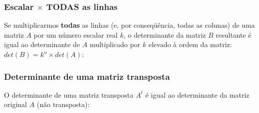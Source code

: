 \documentclass[pdftex, brazil]{beamer}
\begin{document}
\begin{frame}[t]
  \frametitle{Escalar $\times$ TODAS as linhas}
  Se multiplicarmos \textbf{todas} as linhas (e, por conseqüência, todas as
  colunas) de uma matriz $A$ por um número escalar real $k$, o determinante da
  matriz $B$ resultante é igual ao determinante de $A$ multiplicado por $k$ elevado
  à ordem da matriz: $det(B) = k^n \times det(A)$:

\end{frame}

\begin{frame}[t]
  \frametitle{Determinante de uma matriz transposta}
  O determinante de uma matriz transposta $A^t$ é igual ao determinante da
  matriz original $A$ (não transposta):

\end{frame}
\end{document}
